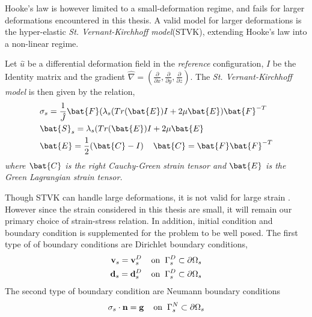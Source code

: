 Hooke's law is however limited to a small-deformation regime, and fails for larger deformations encountered in this thesis. A valid model for larger deformations is the  hyper-elastic \textit{St. \@ Vernant-Kirchhoff model}(STVK), 
extending Hooke's law into a non-linear regime.
 \begin{defn}
Let $\hat{u}$ be a differential deformation field in the \textit{reference} configuration, $I$ be the Identity matrix and the gradient $\hat{\nabla} = (\frac{\partial}{\partial x}, \frac{\partial}{\partial y}, \frac{\partial}{\partial z}) $. The \textit{St. Vernant-Kirchhoff model} is then given by the relation,
\begin{align*}
&\sigma_s = \frac{1}{\hat{J}} \bat{F}(\lambda_s(Tr(\bat{E}) I + 2 \mu \bat{E})\bat{F}^{-T} \\
&\bat{S}_s = \lambda_s(Tr(\bat{E}) I + 2 \mu \bat{E} \\
&\bat{E} = \frac{1}{2}(\bat{C} - I ) \hspace{4mm} \bat{C} = \bat{F}\bat{F}^{-T}
\end{align*} 
\textit{where $\bat{C}$ is the right Cauchy-Green strain tensor and $\bat{E}$ is the Green Lagrangian strain tensor.}
\end{defn}
  
Though STVK can handle large deformations, it is not valid for large strain \cite{Razzaq2010}. However since the strain considered in this thesis are small, it will remain our primary choice of strain-stress relation.
In addition, initial condition and boundary condition is supplemented for the problem to be well posed. The first type of of boundary conditions are Dirichlet boundary conditions, 
\begin{align}
\mathbf{v}_s = \mathbf{v}_s^D 
\hspace{4mm} \text{on} \hspace{2mm} \Gamma_s^D \subset \partial \Omega_s  \\
\mathbf{d}_s = \mathbf{d}_s^D 
\hspace{4mm} \text{on} \hspace{2mm} \Gamma_s^D \subset \partial \Omega_s  \\
\end{align}
The second type of boundary condition are Neumann boundary conditions
\begin{align}
\sigma_s \cdot \mathbf{n} = \mathbf{g}  
\hspace{4mm} \text{on} \hspace{2mm} \Gamma_s^N \subset \partial \Omega_s 
\end{align}
 \newpage
